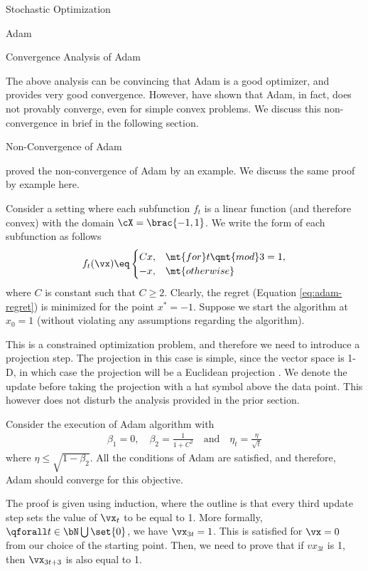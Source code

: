 \documentclass{article}
\begin{document}
\begin{psection}{Stochastic Optimization}
\begin{psubsection}{Adam}
\begin{pssubsection}{Convergence Analysis of Adam}
		\end{pssubsection}

		The above analysis can be convincing that Adam is a good optimizer, and provides very good convergence. However, \cite{non-adam} have shown that Adam, in fact, does not provably converge, even for simple convex problems. We discuss this non-convergence in brief in the following section.

		\begin{pssubsection}{Non-Convergence of Adam}

			\cite{non-adam} proved the non-convergence of Adam by an example. We discuss the same proof by example here.

			Consider a setting where each subfunction $f_t$ is a linear function (and therefore convex) with the domain $\cX = \brac{-1, 1}$. We write the form of each subfunction as follows
			\begin{align*}
				f_t(\vx) \eq \begin{cases}
					Cx, & \mt{for} t \qmt{mod} 3 = 1, \\
					-x, & \mt{otherwise}
				\end{cases}
			\end{align*}
			where $C$ is constant such that $C \ge 2$. Clearly, the regret (Equation \ref{eq:adam-regret}) is minimized for the point $x^\ast = -1$. Suppose we start the algorithm at $x_0 = 1$ (without violating any assumptions regarding the algorithm). 

			\begin{note}
				This is a constrained optimization problem, and therefore we need to introduce a projection step. The projection in this case is simple, since the vector space is 1-D, in which case the projection will be a Euclidean projection \citep{non-adam}. We denote the update before taking the projection with a hat symbol above the data point. This however does not disturb the analysis provided in the prior section.
			\end{note}

			Consider the execution of Adam algorithm with
			\begin{align*}
				\beta_1 = 0, \quad \beta_2 = \frac{1}{1 + C^2} \quad \text{and} \quad \eta_t = \frac{\eta}{\sqrt{t}}
			\end{align*}
			where $\eta \le \sqrt{1 - \beta_2}$. All the conditions of Adam are satisfied, and therefore, Adam should converge for this objective.

			The proof is given using induction, where the outline is that every third update step sets the value of $\vx_t$ to be equal to 1. More formally, $\qforall t \in \bN \bigcup \set{0}$, we have $\vx_{3t} = 1$. This is satisfied for $\vx = 0$ from our choice of the starting point. Then, we need to prove that if $vx_{3t}$ is 1, then $\vx_{3t + 3}$ is also equal to 1.


\end{pssubsection}
\end{psubsection}
\end{psection}
\end{document}
